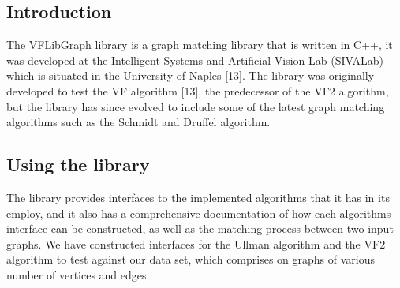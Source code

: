 \label{VFLibGraph Library}

\subsection{Introduction}
The VFLibGraph library is a graph matching library that is written in C++, it was developed at the Intelligent Systems and Artificial Vision Lab (SIVALab) which is situated in the University of Naples [13]. The library was originally developed to test the VF algorithm [13], the predecessor of the VF2 algorithm, but the library has since evolved to include some of the latest graph matching algorithms such as the Schmidt and Druffel algorithm.

\subsection{Using the library}
The library provides interfaces to the implemented algorithms that it has in its employ, and it also has a comprehensive documentation of how each algorithms interface can be constructed, as well as the matching process between two input graphs.\newline\newline
We have constructed interfaces for the Ullman algorithm and the VF2 algorithm to test against our data set, which comprises on graphs of various number of vertices and edges.
\newpage